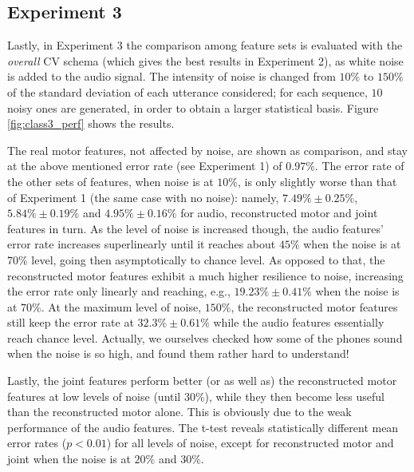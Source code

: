 \subsection{Experiment 3}
\label{subsec:exp3}

Lastly, in Experiment 3 the comparison among feature sets is evaluated with the
\emph{overall} CV schema (which gives the best results in Experiment 2), as white noise is added
to the audio signal. The intensity of noise is changed from $10\%$ to $150\%$ of
the standard deviation of each utterance considered; for each sequence, $10$ noisy
ones are generated, in order to obtain a larger statistical basis.
Figure \ref{fig:class3_perf} shows the results.

The real motor features, not affected by noise, are shown as comparison, and stay at
the above mentioned error rate (see Experiment 1) of $0.97\%$. The error rate of the
other sets of features, when noise is at $10\%$, is only slightly worse than that of
Experiment 1 (the same case with no noise): namely,
$7.49\% \pm 0.25\%$, 
$5.84\% \pm 0.19\%$ and 
$4.95\% \pm 0.16\%$ for audio, reconstructed motor and joint features in turn.
As the level of noise is increased though, the audio features' error rate
increases superlinearly until it reaches about $45\%$ when the noise is at $70\%$
level, going then asymptotically to chance level. As opposed to that, the reconstructed
motor features exhibit a much higher resilience to noise, increasing the error rate
only linearly and reaching, e.g., $19.23\% \pm 0.41\%$ when the noise is at $70\%$.
At the maximum level of noise, $150\%$, the reconstructed motor features still keep
the error rate at $32.3\% \pm 0.61\%$ while the audio features essentially reach chance
level. Actually, we ourselves checked how some of the phones sound when the noise is
so high, and found them rather hard to understand!

Lastly, the joint features perform better (or as well as) the reconstructed motor features
at low levels of noise (until $30\%$), while they then become less useful than the
reconstructed motor alone. This is obviously due to the weak performance of the audio
features.
The t-test reveals statistically different mean error rates ($p<0.01$) for all levels of
noise, except for reconstructed motor and joint when the noise is at $20\%$
and $30\%$.
